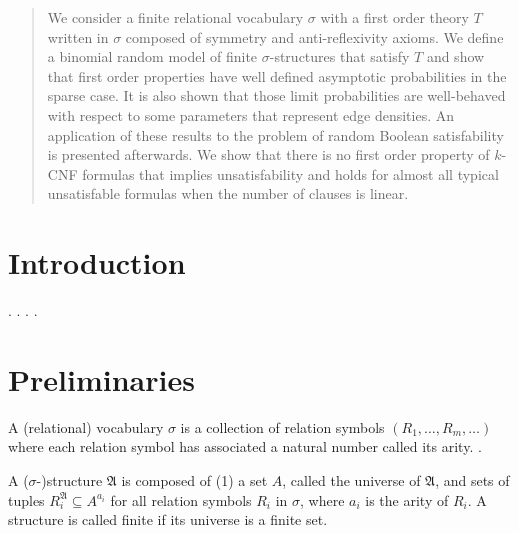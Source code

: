 \documentclass[11pt,notitlepage,a4paper]{article}
\theoremstyle{definition}
\begin{document}
\begin{abstract}
	We consider a finite relational vocabulary $\sigma$ with
    a first order theory $T$ written in $\sigma$ 
    composed of symmetry and 
    anti-reflexivity axioms. We define a binomial random model of finite 
    $\sigma$-structures that satisfy $T$ and show that first order properties have well defined asymptotic probabilities in the sparse 
    case. It is also shown that those limit probabilities are well-behaved with
    respect to some parameters that represent edge densities. 
    An application of these results to the problem of random Boolean 
    satisfability is presented afterwards. 
    We show that there is no first order property of $k$-CNF formulas
    that implies unsatisfability and holds for almost all typical 
    unsatisfable formulas when the number of clauses is linear. 
   
\end{abstract}
\clearpage

\section*{Introduction}
.
.
.
.



\setcounter{section}{-1}

\section{Preliminaries}



A (relational) vocabulary $\sigma$ is a collection of
relation symbols $(R_1,\dots, R_m,\dots)$
where each relation symbol has associated a natural number called its arity.
.\par
 
A ($\sigma$-)structure $\mathfrak{A}$ is composed of (1)
a set $A$, called the universe of $\mathfrak{A}$, and sets of tuples 
$R_i^{\mathfrak{A}}\subseteq A^{a_i}$ for all relation symbols 
$R_i$ in $\sigma$, where $a_i$ is the arity of $R_i$.  
A structure is called finite if its universe is a finite set. 
\end{document}
